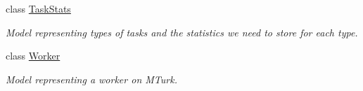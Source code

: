 \begin{DoxyCompactItemize}
class \mbox{\hyperlink{classjoinapp_1_1models_1_1task__management__models_1_1_task_stats}{Task\+Stats}}
\begin{DoxyCompactList}\small\item\em Model representing types of tasks and the statistics we need to store for each type. \end{DoxyCompactList}\item 
class \mbox{\hyperlink{classjoinapp_1_1models_1_1task__management__models_1_1_worker}{Worker}}
\begin{DoxyCompactList}\small\item\em Model representing a worker on M\+Turk. \end{DoxyCompactList}\end{DoxyCompactItemize}
